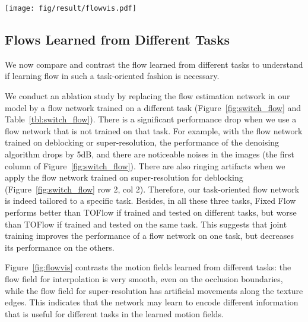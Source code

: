\documentclass[twocolumn,natbib]{svjour3}          \smartqed  \usepackage{graphicx}
\newcommand{\fig}[1]{Figure~\ref{#1}}
\newcommand{\tbl}[1]{Table~\ref{#1}}
\def\model{TOFlow\xspace}
\def\fflow{Fixed Flow\xspace}
\begin{document}
\begin{figure*}[t]
    \centering
    \texttt{[image: fig/result/flowvis.pdf]}
\caption{Visualization of motion fields for different tasks.}
     \label{fig:flowvis}
\end{figure*} 
\subsection{Flows Learned from Different Tasks}

We now compare and contrast the flow learned from different tasks to understand if learning flow in such a task-oriented fashion is necessary.

We conduct an ablation study by replacing the flow estimation network in our model by a flow network trained on a different task (\fig{fig:switch_flow} and \tbl{tbl:switch_flow}). There is a significant performance drop when we use a flow network that is not trained on that task. For example, with the flow network trained on deblocking or super-resolution, the performance of the denoising algorithm drops by 5dB, and there are noticeable noises in the images (the first column of \fig{fig:switch_flow}). There are also ringing artifacts when we apply the flow network trained on super-resolution for deblocking (\fig{fig:switch_flow} row 2, col 2). Therefore, our task-oriented flow network is indeed tailored to a specific task. Besides, in all these three tasks, \fflow performs better than \model if trained and tested on different tasks, but worse than \model if trained and tested on the same task. This suggests that joint training improves the performance of a flow network on one task, but decreases its performance on the others. 

\fig{fig:flowvis} contrasts the motion fields learned from different tasks: the flow field for interpolation is very smooth, even on the occlusion boundaries, while the flow field for super-resolution has artificial movements along the texture edges. This indicates that the network may learn to encode different information that is useful for different tasks in the learned motion fields.
\end{document}

